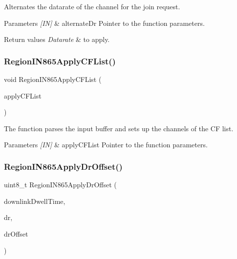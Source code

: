 Alternates the datarate of the channel for the join request. 


\begin{DoxyParams}{Parameters}
{\em \mbox{[}\+I\+N\mbox{]}} & alternate\+Dr Pointer to the function parameters.\\
\hline
\end{DoxyParams}

\begin{DoxyRetVals}{Return values}
{\em Datarate} & to apply. \\
\hline
\end{DoxyRetVals}
\mbox{\label{group__REGIONIN865_ga4b896d2b7f6cd70d1c11b9f38ee06acf}} 
\subsubsection{\texorpdfstring{Region\+I\+N865\+Apply\+C\+F\+List()}{RegionIN865ApplyCFList()}}
{\footnotesize\ttfamily void Region\+I\+N865\+Apply\+C\+F\+List (\begin{DoxyParamCaption}\item[{\hyperlink{group__REGION_ga71588e9ad07e34b78fa91d51881fd3c6}{Apply\+C\+F\+List\+Params\+\_\+t} $\ast$}]{apply\+C\+F\+List }\end{DoxyParamCaption})}



The function parses the input buffer and sets up the channels of the CF list. 


\begin{DoxyParams}{Parameters}
{\em \mbox{[}\+I\+N\mbox{]}} & apply\+C\+F\+List Pointer to the function parameters. \\
\hline
\end{DoxyParams}
\mbox{\label{group__REGIONIN865_ga19226aa295c5ee39d802b597884ece86}} 
\subsubsection{\texorpdfstring{Region\+I\+N865\+Apply\+Dr\+Offset()}{RegionIN865ApplyDrOffset()}}
{\footnotesize\ttfamily uint8\+\_\+t Region\+I\+N865\+Apply\+Dr\+Offset (\begin{DoxyParamCaption}\item[{uint8\+\_\+t}]{downlink\+Dwell\+Time,  }\item[{int8\+\_\+t}]{dr,  }\item[{int8\+\_\+t}]{dr\+Offset }\end{DoxyParamCaption})}



